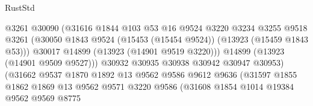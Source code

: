 \begin{lexlean}{RustStd}
\begin{coremodule}
                                        @3261
                                        @30090
                                        (@31616
                                          @1844
                                          @103
                                          @53
                                          @16
                                          @9524
                                          @3220
                                          @3234
                                          @3255
                                          @9518
                                          @3261
                                          (@30050
                                            @1843
                                            @9524
                                            (@15453 (@15454 @9524))
                                            (@13923 (@15459 @1843 @53)))
                                          @30017
                                          @14899
                                          (@13923 (@14901 @9519 @3220)))
                                        @14899
                                        (@13923 (@14901 @9509 @9527)))
                                      @30932
                                      @30935
                                      @30938
                                      @30942
                                      @30947
                                      @30953)
                                    (@31662
                                      @9537
                                      @1870
                                      @1892
                                      @13
                                      @9562
                                      @9586
                                      @9612
                                      @9636
                                      (@31597
                                        @1855
                                        @1862
                                        @1869
                                        @13
                                        @9562
                                        @9571
                                        @3220
                                        @9586
                                        (@31608
                                          @1854
                                          @1014
                                          @19384
                                          @9562
                                          @9569
                                          @8775

\end{coremodule}
\end{lexlean}
